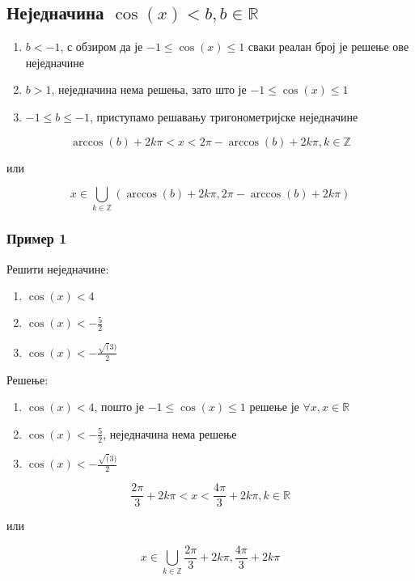 \documentclass[../diplomski.tex]{subfiles}
\begin{document}
\subsection{Неједначина $\cos(x)<b,b\in\mathbb{R}$}

\begin{enumerate}[label=\alph*)]
\item $b<-1$, с обзиром да је $-1\leq\cos(x)\leq1$ сваки реалан број је решење ове неједначине
\item $b>1$, неједначина нема решења, зато што је $-1\leq\cos(x)\leq1$
\item $-1\leq b\leq-1$, приступамо решавању тригонометријске неједначине
\end{enumerate}



\[\arccos(b)+2k\pi<x<2\pi-\arccos(b)+2k\pi,k\in\mathbb{Z}\]
\centerline{или}
\[x\in\bigcup_{k\in\mathbb{Z}}\left(\arccos(b)+2k\pi,2\pi-\arccos(b)+2k\pi\right)\]


\subsubsection{Пример 1}

Решити неједначине:

\begin{enumerate}[label=\alph*)]
\item $\cos(x)<4$
\item $\cos(x)<-\frac{5}{2}$
\item $\cos(x)<-\frac{\sqrt(3)}{2}$
\end{enumerate}

Решење:

\begin{enumerate}[label=\alph*)]
\item $\cos(x)<4$, пошто је $-1\leqslant\cos(x)\leqslant1$ решење је $\forall x,x\in\mathbb{R}$
\item $\cos(x)<-\frac{5}{2}$, неједначина нема решење
\item $\cos(x)<-\frac{\sqrt(3)}{2}$
\end{enumerate}



\[\frac{2\pi}{3}+2k\pi<x<\frac{4\pi}{3}+2k\pi,k\in\mathbb{R}\]
\centerline{или}
\[x\in\bigcup_{k\in\mathbb{Z}}\frac{2\pi}{3}+2k\pi,\frac{4\pi}{3}+2k\pi\]
\end{document}
